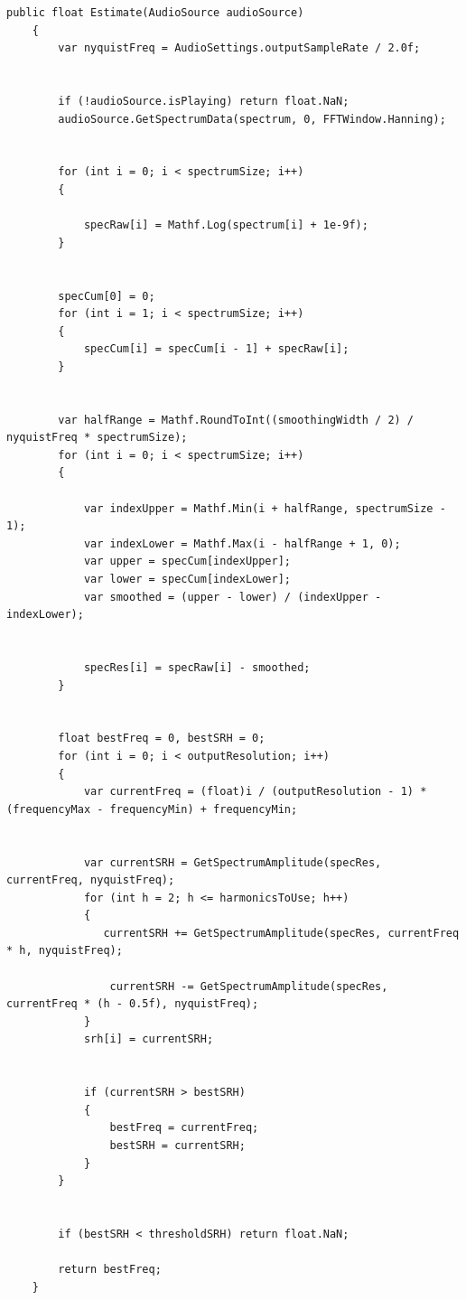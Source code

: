 \begin{lstlisting}[style=sharpcstyle,caption=Funkcja \texttt{Estimate}, label=lst:1]
    public float Estimate(AudioSource audioSource)
    {
        var nyquistFreq = AudioSettings.outputSampleRate / 2.0f;

    
        if (!audioSource.isPlaying) return float.NaN;
        audioSource.GetSpectrumData(spectrum, 0, FFTWindow.Hanning);

   
        for (int i = 0; i < spectrumSize; i++)
        {
           
            specRaw[i] = Mathf.Log(spectrum[i] + 1e-9f);
        }

       
        specCum[0] = 0;
        for (int i = 1; i < spectrumSize; i++)
        {
            specCum[i] = specCum[i - 1] + specRaw[i];
        }

   
        var halfRange = Mathf.RoundToInt((smoothingWidth / 2) / nyquistFreq * spectrumSize);
        for (int i = 0; i < spectrumSize; i++)
        {
        
            var indexUpper = Mathf.Min(i + halfRange, spectrumSize - 1);
            var indexLower = Mathf.Max(i - halfRange + 1, 0);
            var upper = specCum[indexUpper];
            var lower = specCum[indexLower];
            var smoothed = (upper - lower) / (indexUpper - indexLower);

            
            specRes[i] = specRaw[i] - smoothed;
        }

       
        float bestFreq = 0, bestSRH = 0;
        for (int i = 0; i < outputResolution; i++)
        {
            var currentFreq = (float)i / (outputResolution - 1) * (frequencyMax - frequencyMin) + frequencyMin;

           
            var currentSRH = GetSpectrumAmplitude(specRes, currentFreq, nyquistFreq);
            for (int h = 2; h <= harmonicsToUse; h++)
            {
               currentSRH += GetSpectrumAmplitude(specRes, currentFreq * h, nyquistFreq);

                currentSRH -= GetSpectrumAmplitude(specRes, currentFreq * (h - 0.5f), nyquistFreq);
            }
            srh[i] = currentSRH;

           
            if (currentSRH > bestSRH)
            {
                bestFreq = currentFreq;
                bestSRH = currentSRH;
            }
        }

        
        if (bestSRH < thresholdSRH) return float.NaN;

        return bestFreq;
    }
\end{lstlisting}

